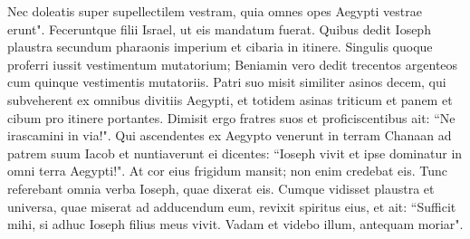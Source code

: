 \begin{biblechapter}
\verse Nec doleatis super supellectilem vestram, quia omnes opes Aegypti vestrae erunt". 
\verse Feceruntque filii Israel, ut eis mandatum fuerat. Quibus dedit Ioseph plaustra secundum pharaonis imperium et cibaria in itinere. 
\verse Singulis quoque proferri iussit vestimentum mutatorium; Beniamin vero dedit trecentos argenteos cum quinque 
\verse vestimentis mutatoriis. Patri suo misit similiter asinos decem, qui subveherent ex omnibus divitiis Aegypti, et totidem asinas triticum et panem et cibum pro itinere portantes. 
\verse Dimisit ergo fratres suos et proficiscentibus ait: “Ne irascamini in via!". 
\verse Qui ascendentes ex Aegypto venerunt in terram Chanaan ad patrem suum Iacob  
\verse et nuntiaverunt ei dicentes: “Ioseph vivit et ipse dominatur in omni terra Aegypti!". At cor eius frigidum mansit; non enim credebat eis. 
\verse Tunc referebant omnia verba Ioseph, quae dixerat eis. Cumque vidisset plaustra et universa, quae miserat ad adducendum eum, revixit spiritus eius, 
\verse et ait: “Sufficit mihi, si adhuc Ioseph filius meus vivit. Vadam et videbo illum, antequam moriar". 
\end{biblechapter}


